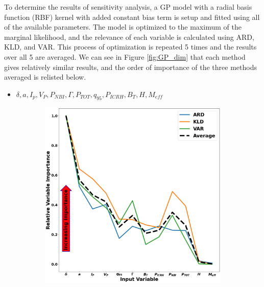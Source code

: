\documentclass[a4paper, twoside, final, 12pt]{article}
\begin{document}
{To determine the results of sensitivity analysis, a GP model with a radial basis function (RBF) kernel with added constant bias term is setup and fitted using all of the available parameters. The model is optimized to the maximum of the marginal likelihood, and the relevance of each variable is calculated using ARD, KLD, and VAR. This process of optimization is repeated 5 times and the results over all 5 are averaged. We can see in Figure \ref{fig:GP_dim} that each method gives relatively similar results, and the order of importance of the three methods averaged is relisted below.  

\begin{itemize}
	\item  $\delta, a, I_p, V_P, P_{NBI},\Gamma, P_{TOT},  q_{95},  P_{ICRH}, B_T, H, M_{eff}$
\end{itemize}
\begin{figure}
	\begin{subfigure}{0.48\linewidth}
		\centering
		\includegraphics[scale=0.2]{ ./src/GP_sensitivity_analysis_final_v1}

\end{subfigure}
\end{figure}}
\end{document}
